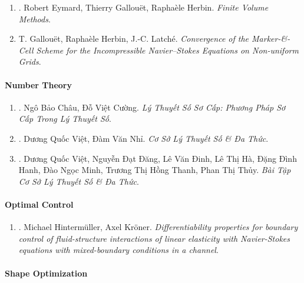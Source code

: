 \documentclass{article}
\begin{document}
\begin{enumerate}
	\item \cite{Eymard_Gallouet_Herbin2019}. Robert Eymard, Thierry Gallou\"et, Rapha\`ele Herbin. {\it Finite Volume Methods}.\hfill{\sf[reading]}
	
	\item T. Gallou\"et, Rapha\`ele Herbin, J.-C. Latch\'e. {\it Convergence of the Marker-\&-Cell Scheme for the Incompressible Navier--Stokes Equations on Non-uniform Grids}.\hfill{\sf[reading]}
\end{enumerate}

\paragraph{Number Theory}

\begin{enumerate}
	\item \cite{Chau_Cuong_basic_number_theory}. {\sc Ngô Bảo Châu, Đỗ Việt Cường}. {\it Lý Thuyết Số Sơ Cấp: Phương Pháp Sơ Cấp Trong Lý Thuyết Số}.\hfill{\sf[reading]}
	
	\item \cite{Viet_Nhi_number_theory_polynomial}. Dương Quốc Việt, Đàm Văn Nhỉ. {\it Cơ Sở Lý Thuyết Số \& Đa Thức}.\hfill{\sf[reading]}
	
	\item \cite{Viet_Dang_Dinh_Ha_Hanh_Minh_Thanh_Thuy2022}. Dương Quốc Việt, Nguyễn Đạt Đăng, Lê Văn Đinh, Lê Thị Hà, Đặng Đình Hanh, Đào Ngọc Minh, Trương Thị Hồng Thanh, Phan Thị Thủy. {\it Bài Tập Cơ Sở Lý Thuyết Số \& Đa Thức}.\hfill{\sf[reading]}
\end{enumerate}

\paragraph{Optimal Control}

\begin{enumerate}
	\item \cite{Hintermueller_Kroener2023}. Michael Hinterm\"uller, Axel Kr\"oner. {\it Differentiability properties for boundary control of fluid-structure interactions of linear elasticity with Navier-Stokes equations with mixed-boundary conditions in a channel}.\hfill{\sf[done]}
\end{enumerate}

\paragraph{Shape Optimization}
\end{document}
